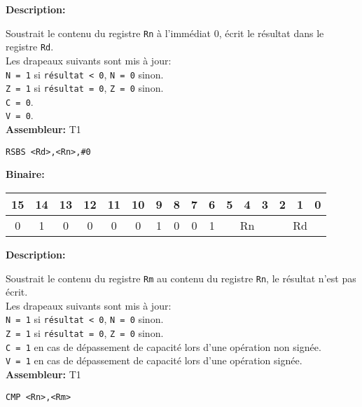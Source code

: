 \textbf{Description: }

Soustrait le contenu du registre \texttt{Rn} à l'immédiat 0, écrit le résultat dans le registre \texttt{Rd}.\\
Les drapeaux suivants sont mis à jour:\\
\texttt{N = 1} si \texttt{résultat < 0}, \texttt{N = 0} sinon.\\
\texttt{Z = 1} si \texttt{résultat = 0}, \texttt{Z = 0} sinon.\\
\texttt{C = 0}.\\
\texttt{V = 0}.\\

\textbf{Assembleur:} T1

\begin{lstlisting}
RSBS <Rd>,<Rn>,#0
\end{lstlisting}

\textbf{Binaire:}\\

\begin{tabular}{| c c c c c c c c c c c c c c c c |}
\hline
15 & 14 & 13 & 12 & 11 & 10 & \multicolumn{1}{|c}{9} & 8 & 7 & 6 & \multicolumn{1}{|c}{5} & 4 & 3 & \multicolumn{1}{|c}{2} & 1 & 0 \\
\hline
0 & 1 & 0 & 0 & 0 & 0 & \multicolumn{1}{|c}{1} & 0 & 0 & 1 & \multicolumn{3}{|c}{Rn} & \multicolumn{3}{|c|}{Rd} \\
\hline
\end{tabular}




\textbf{Description: }

Soustrait le contenu du registre \texttt{Rm} au contenu du registre \texttt{Rn}, le résultat n'est pas écrit.\\
Les drapeaux suivants sont mis à jour:\\
\texttt{N = 1} si \texttt{résultat < 0}, \texttt{N = 0} sinon.\\
\texttt{Z = 1} si \texttt{résultat = 0}, \texttt{Z = 0} sinon.\\
\texttt{C = 1} en cas de dépassement de capacité lors d'une opération non signée.\\
\texttt{V = 1} en cas de dépassement de capacité lors d'une opération signée.\\

\textbf{Assembleur:} T1

\begin{lstlisting}
CMP <Rn>,<Rm>
\end{lstlisting}

